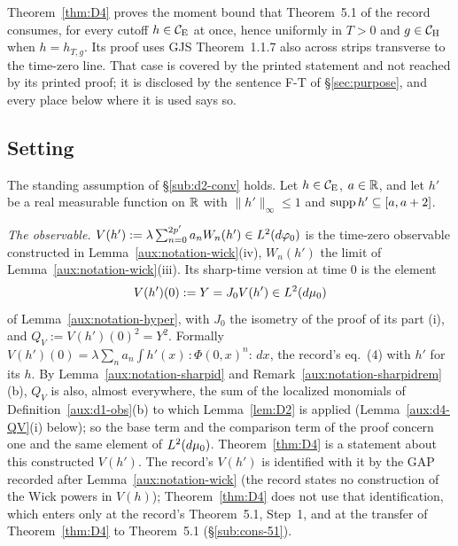 
Theorem~\ref{thm:D4} proves the moment bound that Theorem~5.1 of the record consumes, for every
cutoff $h\in\mathcal{C}_{\mathrm E}$ at once, hence uniformly in $T>0$ and $g\in\mathcal{C}_{\mathrm H}$ when $h=h_{T,g}$.  Its proof
uses GJS Theorem~1.1.7 also across strips transverse to the time-zero line.  That case is
covered by the printed statement and not reached by its printed proof; it is disclosed by the
sentence F-T of \S\ref{sec:purpose}, and every place below where it is used says so.

\subsection{Setting}\label{sub:d4-setting}

The standing assumption of \S\ref{sub:d2-conv} holds.  Let $h\in\mathcal{C}_{\mathrm E}$, $a\in\mathbb{R}$, and let $h'$ be a
real measurable function on $\mathbb{R}$ with $\|h'\|_\infty\le1$ and $\operatorname{supp} h'\subseteq[a,a+2]$.

\emph{The observable.}  $V(h'):=\lambda\sum_{n=0}^{2p'}a_nW_n(h')\in L^2(d\varphi_0)$ is the
time-zero observable constructed in Lemma~\ref{aux:notation-wick}(iv), $W_n(h')$ the limit of
Lemma~\ref{aux:notation-wick}(iii).  Its sharp-time version at time $0$ is the element
\[
 V(h')(0):=Y=J_0V(h')\in L^2(d\mu_0)
\]
of Lemma~\ref{aux:notation-hyper}, with $J_0$ the isometry of the proof of its part (i), and
$Q_V:=V(h')(0)^2=Y^2$.  Formally $V(h')(0)=\lambda\sum_na_n\int h'(x)\,{:}\Phi(0,x)^n{:}\,dx$, the
record's eq.~(4) with $h'$ for its $h$.  By Lemma~\ref{aux:notation-sharpid} and
Remark~\ref{aux:notation-sharpidrem}(b), $Q_V$ is also, almost everywhere, the sum of the
localized monomials of Definition~\ref{aux:d1-obs}(b) to which Lemma~\ref{lem:D2} is applied
(Lemma~\ref{aux:d4-QV}(i) below); so the base term and the comparison term of the proof concern
one and the same element of $L^2(d\mu_0)$.  Theorem~\ref{thm:D4} is a statement about this
constructed $V(h')$.  The record's $V(h')$ is identified with it by the GAP recorded after
Lemma~\ref{aux:notation-wick} (the record states no construction of the Wick powers in $V(h)$);
Theorem~\ref{thm:D4} does not use that identification, which enters only at the record's
Theorem~5.1, Step~1, and at the transfer of Theorem~\ref{thm:D4} to Theorem~5.1
(\S\ref{sub:cons-51}).

